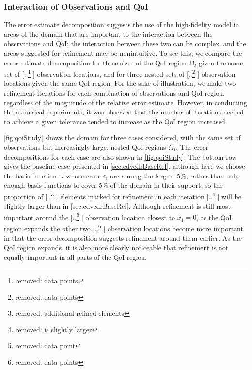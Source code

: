 \documentclass[review]{siamart0516}
\providecommand{\DIFaddtex}[1]{{\protect\color{blue} \sf #1}} %
\providecommand{\DIFdeltex}[1]{{\protect\color{red} [..\footnote{removed: #1} ]}} %
\providecommand{\DIFaddbegin}{} %
\providecommand{\DIFaddend}{} %
\providecommand{\DIFdelbegin}{} %
\providecommand{\DIFdelend}{} %
\providecommand{\DIFadd}[1]{\texorpdfstring{\DIFaddtex{#1}}{#1}} %
\providecommand{\DIFdel}[1]{\texorpdfstring{\DIFdeltex{#1}}{}} %
\newcommand{\DIFscaledelfig}{0.5}
\newlength{\DIFdelgraphicswidth} %
\newlength{\DIFdelgraphicsheight} %
\newcommand{\DIFaddincludegraphics}[2][]{{\color{blue}\fbox{\DIFOincludegraphics[#1]{#2}}}} %
\newcommand{\DIFdelincludegraphics}[2][]{%
\sbox{\DIFdelgraphicsbox}{\DIFOincludegraphics[#1]{#2}}%
\settoboxwidth{\DIFdelgraphicswidth}{\DIFdelgraphicsbox} %
\settoboxtotalheight{\DIFdelgraphicsheight}{\DIFdelgraphicsbox} %
\scalebox{\DIFscaledelfig}{%
\parbox[b]{\DIFdelgraphicswidth}{\usebox{\DIFdelgraphicsbox}\\[-\baselineskip] \rule{\DIFdelgraphicswidth}{0em}}\llap{\resizebox{\DIFdelgraphicswidth}{\DIFdelgraphicsheight}{%
\setlength{\unitlength}{\DIFdelgraphicswidth}%
\begin{picture}(1,1)%
\thicklines\linethickness{2pt} %
{\color[rgb]{1,0,0}\put(0,0){\framebox(1,1){}}}%
{\color[rgb]{1,0,0}\put(0,0){\line( 1,1){1}}}%
{\color[rgb]{1,0,0}\put(0,1){\line(1,-1){1}}}%
\end{picture}%
}\hspace*{3pt}}} %
} %
\DeclareRobustCommand{\DIFaddbegin}{\DIFOaddbegin \let\includegraphics\DIFaddincludegraphics} %
\DeclareRobustCommand{\DIFaddend}{\DIFOaddend \let\includegraphics\DIFOincludegraphics} %
\DeclareRobustCommand{\DIFdelbegin}{\DIFOdelbegin \let\includegraphics\DIFdelincludegraphics} %
\DeclareRobustCommand{\DIFdelend}{\DIFOaddend \let\includegraphics\DIFOincludegraphics} %
\begin{document}
\subsubsection{Interaction of Observations and QoI} \label{sec:qoivdata}
%
The error estimate decomposition suggests the use of the high-fidelity model in areas of the domain that are important to the interaction between the observations and QoI; the interaction between these two can be complex, and the areas suggested for refinement may be nonintuitive. To see this, we compare the error estimate decomposition for three sizes of the QoI region $\Omega_I$ given the same set of \DIFdelbegin \DIFdel{data points}\DIFdelend \DIFaddbegin \DIFadd{observation locations}\DIFaddend , and for three nested sets of \DIFdelbegin \DIFdel{data points }\DIFdelend \DIFaddbegin \DIFadd{observation locations }\DIFaddend given the same QoI region. For the sake of illustration, we make two refinement iterations for each combination of observations and QoI region, regardless of the magnitude of the relative error estimate. However, in conducting the numerical experiments, it was observed that the number of iterations needed to achieve a given tolerance tended to increase as the QoI region increased.

\cref{fig:qoiStudy} shows the domain for three cases considered, with the same set of observations but increasingly large, nested QoI regions $\Omega_I$.
The error decompositions for each case are also shown in \cref{fig:qoiStudy}. The bottom row gives the baseline case presented in \cref{sec:cdvcdrBaseRef}, although here we choose the basis functions $i$ whose error $\varepsilon_i$ are among the largest $5\%$, \DIFaddbegin \DIFadd{rather than only enough basis functions to cover 5\% of the domain in their support, }\DIFaddend so the proportion of \DIFdelbegin \DIFdel{additional refined elements }\DIFdelend \DIFaddbegin \DIFadd{elements marked for refinement }\DIFaddend in each iteration \DIFdelbegin \DIFdel{is slightly larger }\DIFdelend \DIFaddbegin \DIFadd{will be slightly larger than in }\cref{sec:cdvcdrBaseRef}\DIFaddend .
Although refinement is still most important around the \DIFdelbegin \DIFdel{data point }\DIFdelend \DIFaddbegin \DIFadd{observation location }\DIFaddend closest to $x_1=0$, as the QoI region expands the other two \DIFdelbegin \DIFdel{data points }\DIFdelend \DIFaddbegin \DIFadd{observation locations }\DIFaddend become more important in that the error decomposition suggests refinement around them earlier. As the QoI region expands, it is also more clearly noticeable that refinement is not equally important in all parts of the QoI region.
\end{document}
